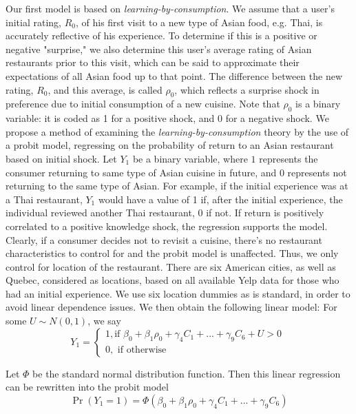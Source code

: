 \documentclass[Journal,letterpaper, NoLineNumbers]{ascelike-new}
\begin{document}
Our first model is based on \textit{learning-by-consumption}. We assume that a user's initial rating, $R_{0}$, of his first visit to a new type of Asian food, e.g. Thai, is accurately reflective of his experience. To determine if this is a positive or negative "surprise," we also determine this user's average rating of Asian restaurants prior to this visit, which can be said to approximate their expectations of all Asian food up to that point. The difference between the new rating, $R_0$, and this average, is called $\rho_0$, which reflects a surprise shock in preference due to initial consumption of a new cuisine. Note that $\rho_0$ is a binary variable: it is coded as 1 for a positive shock, and 0 for a negative shock. We propose a method of examining the \textit{learning-by-consumption} theory by the use of a probit model, regressing on the probability of return to an Asian restaurant based on initial shock. Let $Y_1$ be a binary variable, where $1$ represents the consumer returning to same type of Asian cuisine in future, and $0$ represents not returning to the same type of Asian. For example, if the initial experience was at a Thai restaurant, $Y_1$ would have a value of 1 if, after the initial experience, the individual reviewed another Thai restaurant, 0 if not. If return is positively correlated to a positive knowledge shock, the regression supports the model. Clearly, if a consumer decides not to revisit a cuisine, there's no restaurant characteristics to control for and the probit model is unaffected. Thus, we only control for location of the restaurant. There are six American cities, as well as Quebec, considered as locations, based on all available Yelp data for those who had an initial experience. We use six location dummies as is standard, in order to avoid linear dependence issues. We then obtain the following linear model: For some $U \sim N(0,1)$, we say    
\[Y_1 = \begin{cases}
                        1, \text{if }\beta_0 + \beta_1\rho_{0} + \gamma_4C_1 + ... + \gamma_9C_6 + U > 0 \\
                        0, \text{ if otherwise}
                    \end{cases}\
\]

Let $\Phi$ be the standard normal distribution function. Then this linear regression can be rewritten into the probit model
\begin{equation}
\Pr(Y_1 = 1) = \Phi(\beta_0 + \beta_1\rho_{0} + \gamma_4C_1 + ... + \gamma_9C_6)
\end{equation}
\end{document}
